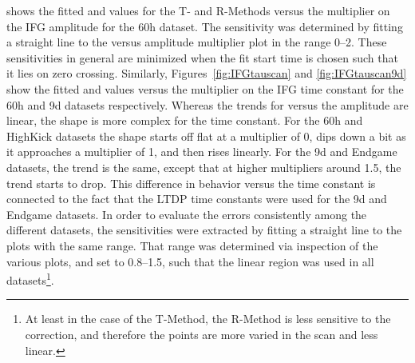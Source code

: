  shows the fitted \R and \chisq values for the T- and R-Methods versus the multiplier on the IFG amplitude for the 60h dataset. The sensitivity was determined by fitting a straight line to the \R versus amplitude multiplier plot in the range 0--2. These sensitivities in general are minimized when the fit start time is chosen such that it lies on \gmtwo zero crossing. Similarly, Figures~\ref{fig:IFGtauscan} and \ref{fig:IFGtauscan9d} show the fitted \R and \chisq values versus the multiplier on the IFG time constant for the 60h and 9d datasets respectively. Whereas the trends for \R versus the amplitude are linear, the shape is more complex for the time constant. For the 60h and HighKick datasets the shape starts off flat at a multiplier of 0, dips down a bit as it approaches a multiplier of 1, and then rises linearly. For the 9d and Endgame datasets, the trend is the same, except that at higher multipliers around 1.5, the trend starts to drop. This difference in behavior versus the time constant is connected to the fact that the LTDP time constants were used for the 9d and Endgame datasets. In order to evaluate the errors consistently among the different datasets, the sensitivities were extracted by fitting a straight line to the plots with the same range. That range was determined via inspection of the various plots, and set to 0.8--1.5, such that the linear region was used in all datasets\footnote{At least in the case of the T-Method, the R-Method is less sensitive to the correction, and therefore the points are more varied in the scan and less linear.}. 



